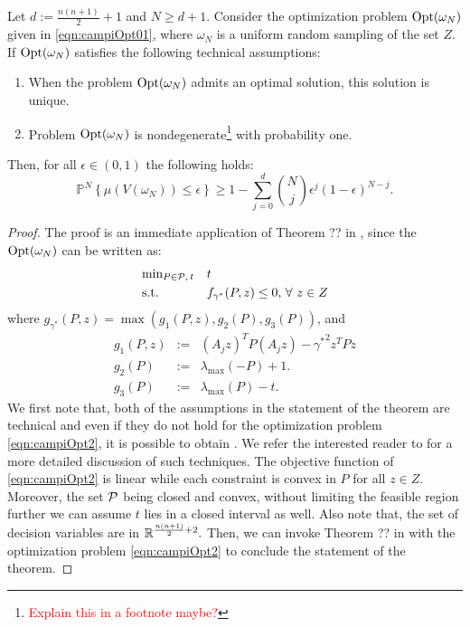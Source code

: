 \begin{theorem}\label{mainTheorem0}
Let $d:=\frac{n(n+1)}{2}+1$ and $N \geq d+1$. Consider the optimization problem $\text{Opt}(\omega_N)$ given in \eqref{eqn:campiOpt01}, where $\omega_N$ is a uniform random sampling of the set $Z$. If $\text{Opt}(\omega_N)$ satisfies the following technical assumptions:
\begin{enumerate}
\item When the problem $\text{Opt}(\omega_N)$ admits an optimal solution, this solution is unique.
\item Problem $\text{Opt}(\omega_N)$ is nondegenerate\footnote{\textcolor{red}{Explain this in a footnote maybe?}} with probability one.
\end{enumerate}
Then, for all $\epsilon \in (0,1)$ the following holds:
\begin{equation}\label{eqn:violation}\mathbb{P}^N\left\{ \mu(V(\omega_N)) \leq \epsilon \right\} \geq 1- \sum_{j=0}^{d} \binom{N}{j}\epsilon^j (1-\epsilon)^{N-j}.\end{equation}
\end{theorem}

\begin{proof}The proof is an immediate application of Theorem ?? in \cite{campi}, since the $\text{Opt}(\omega_N)$
can be written as:
\begin{equation}
\label{eqn:campiOpt2}
\begin{aligned}
& \text{min}_{P \in \mathcal{P},\, t} & & t \\
& \text{s.t.} 
& & f_{\gamma^*}(P, z) \leq 0,\,\forall\ z \in Z\end{aligned}
\end{equation}
where $g_{\gamma^*}(P,z) = \max(g_1(P, z), g_2(P), g_3(P))$, and 
\begin{eqnarray*}
g_1(P, z) &:=& (A_j z)^TP(A_j z) - {\gamma^*}^2 z^TPz \\
g_2(P) &:=& \lambda_{\max}(-P) +1. \\
g_3(P) &:=&  \lambda_{\max}(P) - t.
\end{eqnarray*}
We first note that, both of the assumptions in the statement of the theorem are technical and even if they do not hold for the optimization problem \ref{eqn:campiOpt2}, it is possible to obtain . We refer the interested reader to \cite{campi} for a more detailed discussion of such techniques. The objective function of \eqref{eqn:campiOpt2} is linear while each constraint is convex in $P$ for all $z \in Z$. Moreover, the set $\mathcal{P}$ being closed and convex, without limiting the feasible region further we can assume $t$ lies in a closed interval as well. Also note that, the set of decision variables are in $\mathbb{R}^{\frac{n(n+1)}{2}+2}.$  Then, we can invoke Theorem ?? in \cite{campi} with the optimization problem \eqref{eqn:campiOpt2} to conclude the statement of the theorem.
\end{proof}


